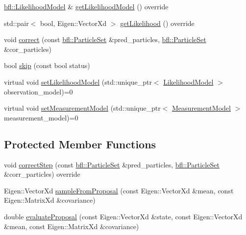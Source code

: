 \begin{DoxyCompactItemize}
\item 
\mbox{\hyperlink{classbfl_1_1LikelihoodModel}{bfl\+::\+Likelihood\+Model}} \& \mbox{\hyperlink{classbfl_1_1GPFCorrection_afa1e971c9b618c50bd98f1d5774cff3a}{get\+Likelihood\+Model}} () override
\item 
std\+::pair$<$ bool, Eigen\+::\+Vector\+Xd $>$ \mbox{\hyperlink{classbfl_1_1GPFCorrection_a0df1185be7731e9077eec265b8d6ff8e}{get\+Likelihood}} () override
\item 
void \mbox{\hyperlink{classbfl_1_1PFCorrection_a560666b2e7566a846cb4ce4684e195e0}{correct}} (const \mbox{\hyperlink{classbfl_1_1ParticleSet}{bfl\+::\+Particle\+Set}} \&pred\+\_\+particles, \mbox{\hyperlink{classbfl_1_1ParticleSet}{bfl\+::\+Particle\+Set}} \&cor\+\_\+particles)
\item 
bool \mbox{\hyperlink{classbfl_1_1PFCorrection_ab25e625ea12fe257e0eb85d465835e62}{skip}} (const bool status)
\item 
virtual void \mbox{\hyperlink{classbfl_1_1PFCorrection_aa84e757c694d4ad375cdd543d42ac34c}{set\+Likelihood\+Model}} (std\+::unique\+\_\+ptr$<$ \mbox{\hyperlink{classbfl_1_1LikelihoodModel}{Likelihood\+Model}} $>$ observation\+\_\+model)=0
\item 
virtual void \mbox{\hyperlink{classbfl_1_1PFCorrection_a9844514568f65a0e5fa2cffadea460c6}{set\+Measurement\+Model}} (std\+::unique\+\_\+ptr$<$ \mbox{\hyperlink{classbfl_1_1MeasurementModel}{Measurement\+Model}} $>$ measurement\+\_\+model)=0
\end{DoxyCompactItemize}
\subsection*{Protected Member Functions}
\begin{DoxyCompactItemize}
\item 
void \mbox{\hyperlink{classbfl_1_1GPFCorrection_a291a05d78f7f2ee835140bfe4995a2bb}{correct\+Step}} (const \mbox{\hyperlink{classbfl_1_1ParticleSet}{bfl\+::\+Particle\+Set}} \&pred\+\_\+particles, \mbox{\hyperlink{classbfl_1_1ParticleSet}{bfl\+::\+Particle\+Set}} \&corr\+\_\+particles) override
\item 
Eigen\+::\+Vector\+Xd \mbox{\hyperlink{classbfl_1_1GPFCorrection_a6f8f793f647296a407fbeefbac781908}{sample\+From\+Proposal}} (const Eigen\+::\+Vector\+Xd \&mean, const Eigen\+::\+Matrix\+Xd \&covariance)
\item 
double \mbox{\hyperlink{classbfl_1_1GPFCorrection_a076c8609b08b17fb3c32eaa4e5b7c3eb}{evaluate\+Proposal}} (const Eigen\+::\+Vector\+Xd \&state, const Eigen\+::\+Vector\+Xd \&mean, const Eigen\+::\+Matrix\+Xd \&covariance)
\end{DoxyCompactItemize}
